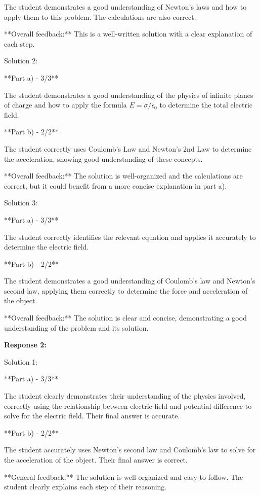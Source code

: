 \documentclass[a4paper,11pt]{article}
\begin{document}
The student demonstrates a good understanding of Newton's laws and how to apply them to this problem. The calculations are also correct.

**Overall feedback:** This is a well-written solution with a clear explanation of each step.

Solution 2:

**Part a) - 3/3**

The student demonstrates a good understanding of the physics of infinite planes of charge and how to apply the formula \( E = \sigma/\epsilon_0 \) to determine the total electric field.

**Part b) - 2/2**

The student correctly uses Coulomb's Law and Newton's 2nd Law to determine the acceleration, showing good understanding of these concepts.

**Overall feedback:** The solution is well-organized and the calculations are correct, but it could benefit from a more concise explanation in part a).

Solution 3:

**Part a) - 3/3**

The student correctly identifies the relevant equation and applies it accurately to determine the electric field.

**Part b) - 2/2**

The student demonstrates a good understanding of Coulomb's law and Newton's second law, applying them correctly to determine the force and acceleration of the object.

**Overall feedback:** The solution is clear and concise, demonstrating a good understanding of the problem and its solution.

\bigskip    
\textbf{Response 2:}

Solution 1:

**Part a) - 3/3**

The student clearly demonstrates their understanding of the physics involved, correctly using the relationship between electric field and potential difference to solve for the electric field. Their final answer is accurate.

**Part b) - 2/2**

The student accurately uses Newton's second law and Coulomb's law to solve for the acceleration of the object. Their final answer is correct.

**General feedback:** The solution is well-organized and easy to follow. The student clearly explains each step of their reasoning.
\end{document}
